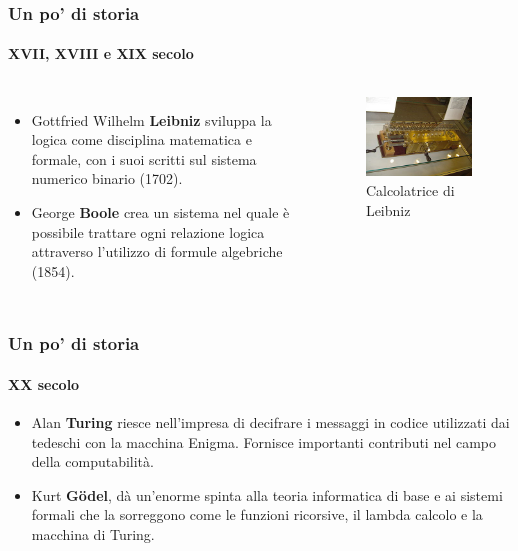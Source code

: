 \documentclass[11pt]{beamer}
\begin{document}
    \begin{frame}
        \frametitle{Un po' di storia}
        \framesubtitle{XVII, XVIII e XIX secolo}

        \begin{columns}
            \begin{itemize}
                \item Gottfried Wilhelm \textbf{Leibniz} sviluppa la logica come disciplina matematica e formale, con i suoi scritti sul \alert{sistema numerico binario} (1702).

                \item George \textbf{Boole} crea un sistema nel quale è possibile trattare ogni relazione logica attraverso l'utilizzo di \alert{formule algebriche} (1854).
            \end{itemize}

            \begin{figure}
                \includegraphics[scale=0.4]{img/calcolatrice-leibniz.jpg}
                \caption{Calcolatrice di Leibniz}
            \end{figure}
        \end{columns}
    \end{frame}

    \begin{frame}
        \frametitle{Un po' di storia}
        \framesubtitle{XX secolo}

        \begin{itemize}
            \item Alan \textbf{Turing} riesce nell'impresa di decifrare i messaggi in codice utilizzati dai tedeschi con la macchina Enigma. Fornisce importanti contributi nel campo della \alert{computabilità}.

            \item Kurt \textbf{Gödel}, dà un'enorme spinta alla teoria informatica di base e ai sistemi formali che la sorreggono come le \alert{funzioni ricorsive}, il \alert{lambda calcolo} e la \alert{macchina di Turing}.
        \end{itemize}
    \end{frame}
\end{document}
